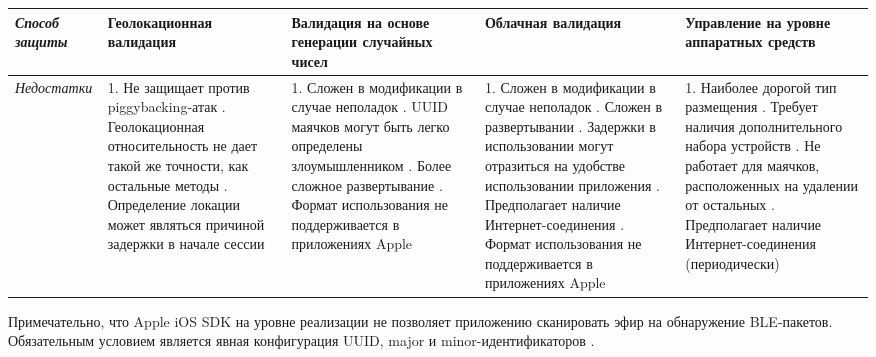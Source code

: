 \begin{sideways}
\begin{tabu} to 
\hline
\textit{Способ защиты} & 
    \textbf{Геолокационная валидация} & 
    \textbf{Валидация на основе генерации случайных чисел} &
    \textbf{Облачная валидация} &
    \textbf{Управление на уровне аппаратных средств} \\
\hline

\textit{Недостатки} & 
    1. Не защищает против piggybacking-атак . Геолокационная относительность не дает такой же точности, как остальные методы . Определение локации может являться причиной задержки в начале сессии &
    
    1. Сложен в модификации в случае неполадок . UUID маячков могут быть легко определены злоумышленником . Более сложное развертывание . Формат использования не поддерживается в приложениях Apple &
    
    1. Сложен в модификации в случае неполадок . Сложен в развертывании . Задержки в использовании могут отразиться на удобстве использовании приложения . Предполагает наличие Интернет-соединения . Формат использования не поддерживается в приложениях Apple &
    
    1. Наиболее дорогой тип размещения . Требует наличия дополнительного набора устройств . Не работает для маячков, расположенных на удалении от остальных . Предполагает наличие Интернет-соединения (периодически)\\
 \hline
\end{tabu}
\end{sideways}

\clearpage
\newpage

Примечательно, что Apple iOS SDK на уровне реализации не позволяет приложению сканировать эфир на обнаружение BLE-пакетов. Обязательным условием является явная конфигурация UUID, major и minor-идентификаторов \cite{web:CoreBlRestrict}.